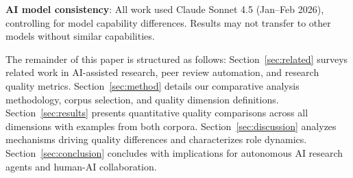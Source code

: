 \textbf{AI model consistency}: All work used Claude Sonnet 4.5 (Jan--Feb 2026), controlling for model capability differences. Results may not transfer to other models without similar capabilities.

The remainder of this paper is structured as follows: Section~\ref{sec:related} surveys related work in AI-assisted research, peer review automation, and research quality metrics. Section~\ref{sec:method} details our comparative analysis methodology, corpus selection, and quality dimension definitions. Section~\ref{sec:results} presents quantitative quality comparisons across all dimensions with examples from both corpora. Section~\ref{sec:discussion} analyzes mechanisms driving quality differences and characterizes role dynamics. Section~\ref{sec:conclusion} concludes with implications for autonomous AI research agents and human-AI collaboration.
